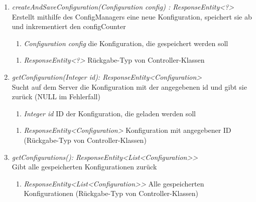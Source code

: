\begin{enumerate}[+]
	\item \textit{ createAndSaveConfiguration(Configuration config) : ResponseEntity<?> } \\
	Erstellt mithilfe des ConfigManagers eine neue Konfiguration, speichert sie ab und inkrementiert den configCounter
	
	\begin{enumerate}[$\bullet$]
		\item \textit{Configuration config} die Konfiguration, die gespeichert werden soll
	\end{enumerate}
	\vspace{-0.2cm}
	\begin{enumerate}[$\circ$]
		\item \textit{ResponseEntity<?>} Rückgabe-Typ von Controller-Klassen
	\end{enumerate}
	
		\item \textit{ getConfiguration(Integer id): ResponseEntity<Configuration> }\\
		Sucht auf dem Server die Konfiguration mit der angegebenen id und gibt sie zurück (NULL im Fehlerfall)
	
	\begin{enumerate}[$\bullet$]
		\item \textit{Integer id} ID der Konfiguration, die geladen werden soll
		
	\end{enumerate}
	\vspace{-0.2cm}
	\begin{enumerate}[$\circ$]
		\item \textit{ResponseEntity<Configuration>} Konfiguration mit angegebener ID (Rückgabe-Typ von Controller-Klassen)
	\end{enumerate}
	\item \textit{ getConfigurations(): ResponseEntity<List<Configuration>> }\\
	Gibt alle gespeicherten Konfigurationen zurück
	
	\begin{enumerate}[$\circ$]
		\item \textit{ResponseEntity<List<Configuration>>} Alle gespeicherten Konfigurationen (Rückgabe-Typ von Controller-Klassen)
	\end{enumerate}
\end{enumerate}